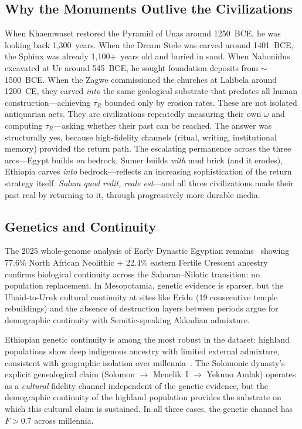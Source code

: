 \documentclass[
  aps,
  prd,
  twocolumn,
  superscriptaddress,
  nofootinbib,
  floatfix
]{revtex4-2}
\newcommand{\tR}{\tau_{\!R}}
\begin{document}
\subsection{Why the Monuments Outlive the
Civilizations}

When Khaemwaset restored the Pyramid of Unas around
1250~BCE, he was looking back 1,300~years.  When the
Dream Stele was carved around 1401~BCE, the Sphinx
was already 1,100+~years old and buried in sand.
When Nabonidus excavated at Ur around 545~BCE, he
sought foundation deposits from $\sim$1500~BCE.
When the Zagwe commissioned the churches at Lalibela
around 1200~CE, they carved \emph{into} the same
geological substrate that predates all human
construction---achieving $\tR$ bounded only by
erosion rates.
These are not isolated antiquarian acts.  They are
civilizations repeatedly measuring their own $\omega$
and computing $\tR$---asking whether their past can
be reached.  The answer was structurally yes, because
high-fidelity channels (ritual, writing, institutional
memory) provided the return path.  The escalating
permanence across the three arcs---Egypt builds
\emph{on} bedrock, Sumer builds \emph{with} mud brick
(and it erodes), Ethiopia carves \emph{into}
bedrock---reflects an increasing sophistication of
the return strategy itself.
\emph{Solum quod redit, reale est}---and all three
civilizations made their past real by returning to it,
through progressively more durable media.

\subsection{Genetics and Continuity}

The 2025 whole-genome analysis of Early Dynastic
Egyptian remains~\cite{marshall2025genome} showing
77.6\% North African Neolithic + 22.4\% eastern
Fertile Crescent ancestry confirms biological
continuity across the Saharan--Nilotic transition:
no population replacement.  In Mesopotamia, genetic
evidence is sparser, but the Ubaid-to-Uruk cultural
continuity at sites like Eridu (19 consecutive temple
rebuildings) and the absence of destruction layers
between periods argue for demographic continuity
with Semitic-speaking Akkadian admixture.

Ethiopian genetic continuity is among the most
robust in the dataset: highland populations show
deep indigenous ancestry with limited external
admixture, consistent with geographic isolation
over millennia~\cite{marcus2002ethiopia}.
The Solomonic dynasty's explicit genealogical
claim (Solomon $\to$ Menelik~I $\to$ Yekuno Amlak)
operates as a \emph{cultural} fidelity channel
independent of the genetic evidence, but the
demographic continuity of the highland population
provides the substrate on which this cultural
claim is sustained.  In all three cases, the
genetic channel has $F > 0.7$ across millennia.
\end{document}
